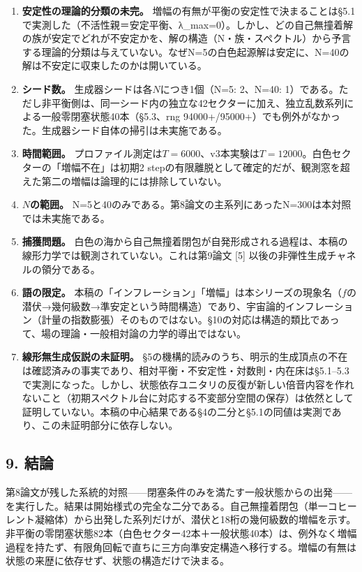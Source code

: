 \documentclass[
  a4paper,
]{ltjsarticle}
\providecommand{\tightlist}{%
  \setlength{\itemsep}{0pt}\setlength{\parskip}{0pt}}
\begin{document}
\begin{enumerate}
\def\labelenumi{\arabic{enumi}.}
\tightlist
\item
  \textbf{安定性の理論的分類の未完。}
  増幅の有無が平衡の安定性で決まることは§5.1で実測した（不活性親＝安定平衡、λ\_max=0）。しかし、どの自己無撞着解の族が安定でどれが不安定かを、解の構造（N・族・スペクトル）から予言する理論的分類は与えていない。なぜN=5の白色起源解は安定に、N=40の解は不安定に収束したのかは開いている。
\item
  \textbf{シード数。} 生成器シードは各\(N\)につき1個（N=5: 2、N=40:
  1）である。ただし非平衡側は、同一シード内の独立な42セクターに加え、独立乱数系列による一般零閉塞状態40本（§5.3、rng
  94000+/95000+）でも例外がなかった。生成器シード自体の掃引は未実施である。
\item
  \textbf{時間範囲。}
  プロファイル測定は\(T=6000\)、v3本実験は\(T=12000\)。白色セクターの「増幅不在」は初期2
  stepの有限離脱として確定的だが、観測窓を超えた第二の増幅は論理的には排除していない。
\item
  \textbf{\(N\)の範囲。}
  N=5と40のみである。第8論文の主系列にあったN=300は本対照では未実施である。
\item
  \textbf{捕獲問題。}
  白色の海から自己無撞着閉包が自発形成される過程は、本稿の線形力学では観測されていない。これは第9論文
  {[}5{]} 以後の非弾性生成チャネルの領分である。
\item
  \textbf{語の限定。}
  本稿の「インフレーション」「増幅」は本シリーズの現象名（\(f\)の潜伏→幾何級数→準安定という時間構造）であり、宇宙論的インフレーション（計量の指数膨張）そのものではない。§10の対応は構造的類比であって、場の理論・一般相対論の力学的導出ではない。
\item
  \textbf{線形無生成仮説の未証明。}
  §5の機構的読みのうち、明示的生成頂点の不在は確認済みの事実であり、相対平衡・不安定性・対数則・内在床は§5.1--5.3で実測になった。しかし、状態依存ユニタリの反復が新しい倍音内容を作れないこと（初期スペクトル台に対応する不変部分空間の保存）は依然として証明していない。本稿の中心結果である§4の二分と§5.1の同値は実測であり、この未証明部分に依存しない。
\end{enumerate}

\subsection{9. 結論}\label{ux7d50ux8ad6}

第8論文が残した系統的対照------閉塞条件のみを満たす一般状態からの出発------を実行した。結果は開始様式の完全な二分である。自己無撞着閉包（単一コヒーレント凝縮体）から出発した系列だけが、潜伏と18桁の幾何級数的増幅を示す。非平衡の零閉塞状態82本（白色セクター42本＋一般状態40本）は、例外なく増幅過程を持たず、有限角回転で直ちに三方向準安定構造へ移行する。増幅の有無は状態の来歴に依存せず、状態の構造だけで決まる。
\end{document}
